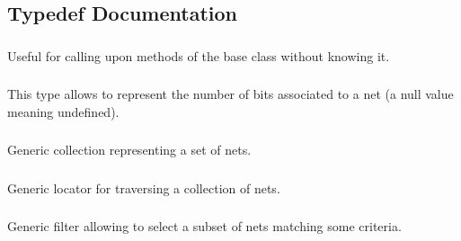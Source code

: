 \subsection{Typedef Documentation}
\hypertarget{group__NetClass_ga3f1ac0fcb03638b2ffa9af6a9a58de15}{
\subsubsection[{Inherit}]{}}\label{group__NetClass_ga3f1ac0fcb03638b2ffa9af6a9a58de15}
Useful for calling upon methods of the base class without knowing it. \hypertarget{group__NetClass_ga3a242d929e0c733f90f3f69be8cc427b}{
\subsubsection[{Arity}]{}}\label{group__NetClass_ga3a242d929e0c733f90f3f69be8cc427b}
This type allows to represent the number of bits associated to a net (a null value meaning undefined). \hypertarget{group__NetClass_ga3404a8b17130a1824f4a281704b04df7}{
\subsubsection[{Nets}]{}}\label{group__NetClass_ga3404a8b17130a1824f4a281704b04df7}
Generic collection representing a set of nets. \hypertarget{group__NetClass_ga2911512d442f8332c3cd3a135332cc02}{
\subsubsection[{Net\-Locator}]{}}\label{group__NetClass_ga2911512d442f8332c3cd3a135332cc02}
Generic locator for traversing a collection of nets. \hypertarget{group__NetClass_ga0dfd2c5b40325a919d139091312732e9}{
\subsubsection[{Net\-Filter}]{}}\label{group__NetClass_ga0dfd2c5b40325a919d139091312732e9}
Generic filter allowing to select a subset of nets matching some criteria. 

